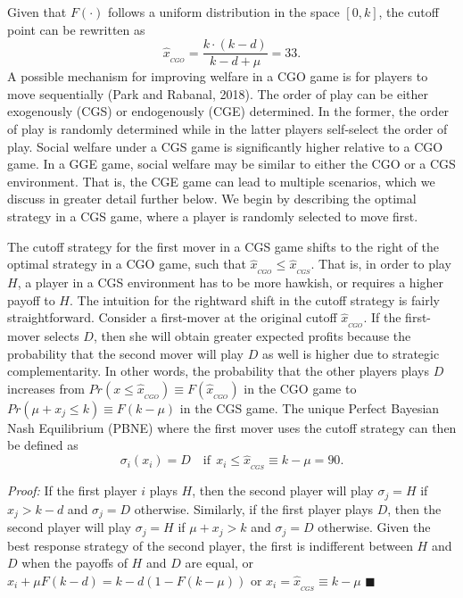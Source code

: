 \documentclass[12pt,english]{article}
\begin{document}
\noindent Given that $F(\cdot)$ follows a uniform distribution in the space $[0,k]$, the cutoff point can be rewritten as 
\begin{equation}
\hat{x}_{_{CGO}}= \frac{k\cdot (k-d)}{k-d+\mu}=33. \label{eq:cgosol}
\end{equation}
A possible mechanism for improving welfare in a CGO game is for players to move sequentially (Park and Rabanal, 2018). The order of play can be either exogenously (CGS) or endogenously (CGE) determined. In the former, the order of play is randomly determined while in the latter players self-select the order of play. Social welfare under a CGS game is significantly higher relative to a CGO game. In a GGE game, social welfare may be similar to either the CGO or a CGS environment. That is, the CGE game can lead to multiple scenarios, which we discuss in greater detail further below. We begin by describing the optimal strategy in a CGS game, where a player is randomly selected to move first. 

The cutoff strategy for the first mover in a CGS game shifts to the right of the optimal strategy in a CGO game, such that $\hat{x}_{_{CGO}}\leq\hat{x}_{_{CGS}}$. That is, in order to play $H$, a player in a CGS environment has to be more hawkish, or requires a higher payoff to $H$. The intuition for the rightward shift in the cutoff strategy is fairly straightforward. Consider a first-mover at the original cutoff $\hat{x}_{_{CGO}}$. If the first-mover selects $D$, then she will obtain greater expected profits because the probability that the second mover will play $D$ as well is higher due to strategic complementarity. In other words, the probability that the other players plays $D$ increases from $Pr(x\leq\hat{x}_{_{CGO}}) \equiv F(\hat{x}_{_{CGO}}) $ in the CGO game to  $Pr(\mu+x_j\leq k) \equiv F(k-\mu)  $ in the CGS game. The unique Perfect Bayesian Nash Equilibrium (PBNE) where the first mover uses the cutoff strategy can then be defined as
\begin{equation}
\sigma_i(x_i)=D \quad \text{if} \ \ x_i\leq \hat{x}_{_{CGS}} \equiv k-\mu=90. 
\end{equation}

\noindent \textit{Proof:} If the first player $i$ plays $H$, then the second player will play $\sigma_j= H$ if $x_j> k-d$ and $\sigma_j= D$ otherwise. Similarly, if the first player plays $D$, then the second player will play $\sigma_j= H$ if $\mu+x_j> k$ and  $\sigma_j= D$ otherwise. Given the best response strategy of the second player, the first is indifferent between $H$ and $D$ when the payoffs of $H$ and $D$ are equal, or $x_i + \mu F(k-d) = k - d(1-F(k-\mu))$ or $x_i=\hat{x}_{_{CGS}}\equiv k-\mu$ $\blacksquare$
\end{document}
